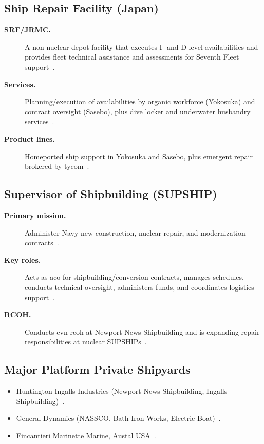 \documentclass[../main.tex]{subfiles}
\begin{document}
\subsection{Ship Repair Facility (Japan)}
\begin{description}
  \item[\textbf{SRF/JRMC.}] A non-nuclear depot facility that executes I- and D-level availabilities and provides fleet technical assistance and assessments for Seventh Fleet support~\autocite{edo-4-1-1-fleet-maint-assets-2025}.
  \item[\textbf{Services.}] Planning/execution of availabilities by organic workforce (Yokosuka) and contract oversight (Sasebo), plus dive locker and underwater husbandry services~\autocite{edo-4-1-1-fleet-maint-assets-2025}.
  \item[\textbf{Product lines.}] Homeported ship support in Yokosuka and Sasebo, plus emergent repair brokered by \ac{tycom}~\autocite{edo-4-1-1-fleet-maint-assets-2025}.
\end{description}

\subsection{Supervisor of Shipbuilding (SUPSHIP)}
\begin{description}
  \item[\textbf{Primary mission.}] Administer Navy new construction, nuclear repair, and modernization contracts~\autocite{edo-4-1-1-fleet-maint-assets-2025}.
  \item[\textbf{Key roles.}] Acts as \ac{aco} for shipbuilding/conversion contracts, manages schedules, conducts technical oversight, administers funds, and coordinates logistics support~\autocite{edo-4-1-1-fleet-maint-assets-2025}.
  \item[\textbf{RCOH.}] Conducts \ac{cvn} \ac{rcoh} at Newport News Shipbuilding and is expanding repair responsibilities at nuclear SUPSHIPs~\autocite{edo-4-1-1-fleet-maint-assets-2025}.
\end{description}

\subsection{Major Platform Private Shipyards}
\begin{itemize}
  \item Huntington Ingalls Industries (Newport News Shipbuilding, Ingalls Shipbuilding)~\autocite{edo-4-1-1-fleet-maint-assets-2025}.
  \item General Dynamics (NASSCO, Bath Iron Works, Electric Boat)~\autocite{edo-4-1-1-fleet-maint-assets-2025}.
  \item Fincantieri Marinette Marine, Austal USA~\autocite{edo-4-1-1-fleet-maint-assets-2025}.
\end{itemize}
\end{document}
